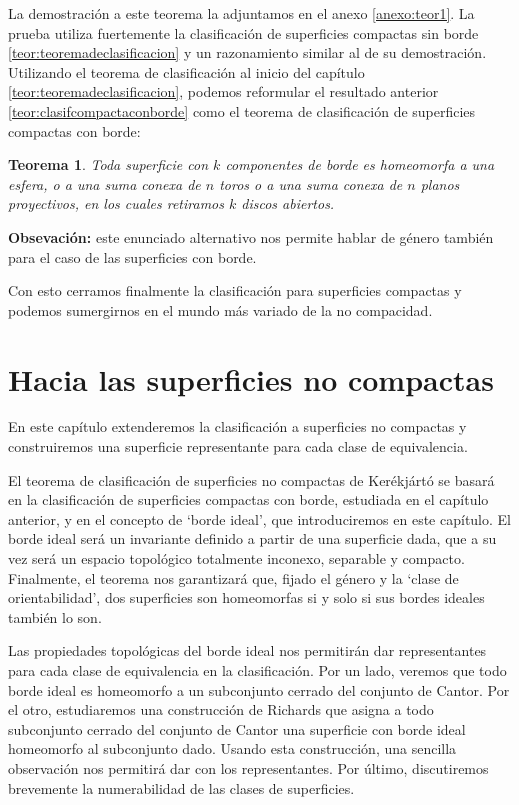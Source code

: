 \documentclass[a4paper,11pt,spanish, twoside, leqno]{tfg-uam}
\newtheorem*{teorsin}{Teorema}
\theoremstyle{definition}
\begin{document}
La demostración a este teorema la adjuntamos en el anexo \ref{anexo:teor1}. La prueba utiliza fuertemente la clasificación de superficies compactas sin borde \ref{teor:teoremadeclasificacion} y un razonamiento similar al de su demostración. \\
Utilizando el teorema de clasificación al inicio del capítulo \ref{teor:teoremadeclasificacion}, podemos reformular el resultado anterior \ref{teor:clasifcompactaconborde} como el teorema de clasificación de superficies compactas con borde:

\begin{teorsin}
Toda superficie con $k$ componentes de borde es homeomorfa a una esfera, o a una suma conexa de $n$ toros o a una suma conexa de $n$ planos proyectivos, en los cuales retiramos $k$ discos abiertos.
\end{teorsin}
\noindent \textbf{Obsevación:} este enunciado alternativo nos permite hablar de género también para el caso de las superficies con borde. 

Con esto cerramos finalmente la clasificación para superficies compactas y  podemos sumergirnos en el mundo más variado de la no compacidad.



\chapter{Hacia las superficies no compactas}
En este capítulo extenderemos la clasificación a superficies no compactas y construiremos una superficie representante para cada clase de equivalencia.

El teorema de clasificación de superficies no compactas de Kerékjártó se basará en la clasificación de superficies compactas con borde, estudiada en el capítulo anterior, y en el concepto de `borde ideal', que introduciremos en este capítulo. El borde ideal será un invariante  definido a partir de una superficie dada, que a su vez será un espacio topológico totalmente inconexo, separable y compacto. Finalmente, el teorema nos garantizará que, fijado el género y la `clase de orientabilidad', dos superficies son homeomorfas si y solo si sus bordes ideales también lo son.

Las propiedades topológicas del borde ideal nos permitirán dar representantes para cada clase de equivalencia en la clasificación. Por un lado, veremos que todo borde ideal es homeomorfo a un subconjunto cerrado del conjunto de Cantor. Por el otro, estudiaremos una construcción de Richards que  asigna a todo subconjunto cerrado del conjunto de Cantor una superficie con borde ideal homeomorfo al subconjunto dado. Usando esta construcción, una sencilla observación nos permitirá dar con los representantes. Por último, discutiremos brevemente la numerabilidad de las clases de superficies. 
\end{document}
